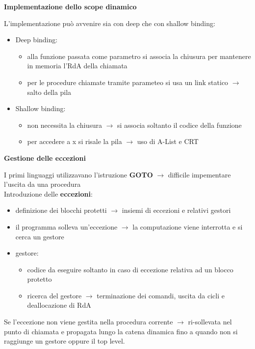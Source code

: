 \documentclass{article}
\begin{document}
\begin{flushleft}
\medskip

\textbf{Implementazione dello scope dinamico}

L'implementazione può avvenire sia con deep che con shallow binding:

\begin{itemize}
    \item Deep binding: 
    \begin{itemize}
        \item alla funzione passata come parametro si associa la chiusura per mantenere in memoria l'RdA della chiamata
        \item per le procedure chiamate tramite parameteo si usa un link statico $\rightarrow$ salto della pila
    \end{itemize}
    \item Shallow binding: 
    \begin{itemize}
        \item non necessita la chiusura $\rightarrow$ si associa soltanto il codice della funzione
        \item per accedere a x si risale la pila $\rightarrow$ uso di A-List e CRT
    \end{itemize}
\end{itemize}

\medskip

\textbf{Gestione delle eccezioni}

I primi linguaggi utilizzavano l'istruzione \textbf{GOTO} $\rightarrow$ difficile impementare l'uscita da una procedura \\
Introduzione delle \textbf{eccezioni}:

\begin{itemize}
    \item definizione dei blocchi protetti $\rightarrow$ insiemi di eccezioni e relativi gestori
    \item il programma solleva un'eccezione $\rightarrow$ la computazione viene interrotta e si cerca un gestore
    \item gestore: 
    \begin{itemize}
        \item codice da eseguire soltanto in caso di eccezione relativa ad un blocco protetto
        \item ricerca del gestore $\rightarrow$ terminazione dei comandi, uscita da cicli e deallocazione di RdA
    \end{itemize}
\end{itemize}

Se l'eccezione non viene gestita nella procedura corrente $\rightarrow$ ri-sollevata nel punto di chiamata e propagata lungo la 
catena dinamica fino a quando non si raggiunge un gestore oppure il top level.

\end{flushleft}
\end{document}

